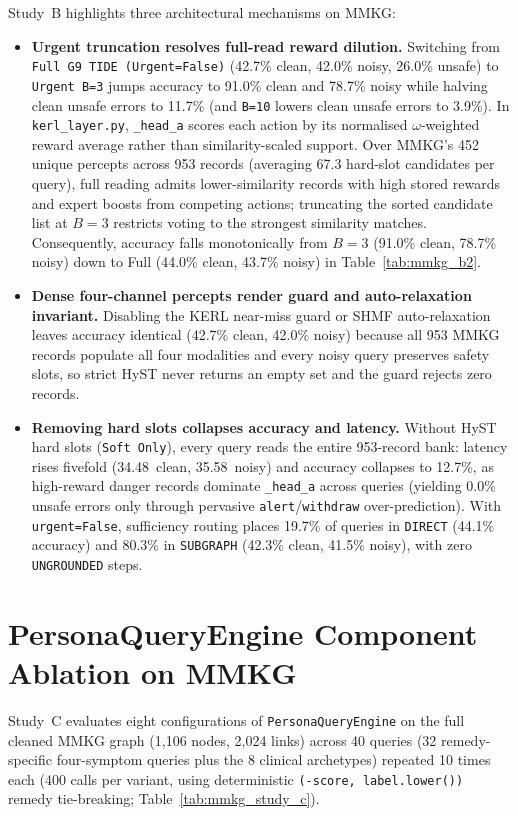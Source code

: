 \documentclass[12pt,a4paper,oneside]{report}
\newcommand{\code}[1]{\texttt{\small #1}}
\newcommand{\ms}{\,\text{ms}}
\begin{document}
\noindent Study~B highlights three architectural mechanisms on MMKG:
\begin{itemize}
  \item \textbf{Urgent truncation resolves full-read reward dilution.} Switching from \code{Full G9 TIDE (Urgent=False)} (42.7\% clean, 42.0\% noisy, 26.0\% unsafe) to \code{Urgent B=3} jumps accuracy to 91.0\% clean and 78.7\% noisy while halving clean unsafe errors to 11.7\% (and \code{B=10} lowers clean unsafe errors to 3.9\%). In \code{kerl\_layer.py}, \code{\_head\_a} scores each action by its normalised $\omega$-weighted reward average rather than similarity-scaled support. Over MMKG's 452 unique percepts across 953 records (averaging 67.3 hard-slot candidates per query), full reading admits lower-similarity records with high stored rewards and expert boosts from competing actions; truncating the sorted candidate list at $B=3$ restricts voting to the strongest similarity matches. Consequently, accuracy falls monotonically from $B=3$ (91.0\% clean, 78.7\% noisy) down to Full (44.0\% clean, 43.7\% noisy) in Table~\ref{tab:mmkg_b2}.
  \item \textbf{Dense four-channel percepts render guard and auto-relaxation invariant.} Disabling the KERL near-miss guard or SHMF auto-relaxation leaves accuracy identical (42.7\% clean, 42.0\% noisy) because all 953 MMKG records populate all four modalities and every noisy query preserves safety slots, so strict HyST never returns an empty set and the guard rejects zero records.
  \item \textbf{Removing hard slots collapses accuracy and latency.} Without HyST hard slots (\code{Soft Only}), every query reads the entire 953-record bank: latency rises fivefold (34.48\ms{} clean, 35.58\ms{} noisy) and accuracy collapses to 12.7\%, as high-reward danger records dominate \code{\_head\_a} across queries (yielding 0.0\% unsafe errors only through pervasive \code{alert}/\code{withdraw} over-prediction). With \code{urgent=False}, sufficiency routing places 19.7\% of queries in \code{DIRECT} (44.1\% accuracy) and 80.3\% in \code{SUBGRAPH} (42.3\% clean, 41.5\% noisy), with zero \code{UNGROUNDED} steps.
\end{itemize}

\section{PersonaQueryEngine Component Ablation on MMKG}
Study~C evaluates eight configurations of \code{PersonaQueryEngine} on the full cleaned MMKG graph (1,106 nodes, 2,024 links) across 40 queries (32 remedy-specific four-symptom queries plus the 8 clinical archetypes) repeated 10 times each (400 calls per variant, using deterministic \code{(-score, label.lower())} remedy tie-breaking; Table~\ref{tab:mmkg_study_c}).
\end{document}
